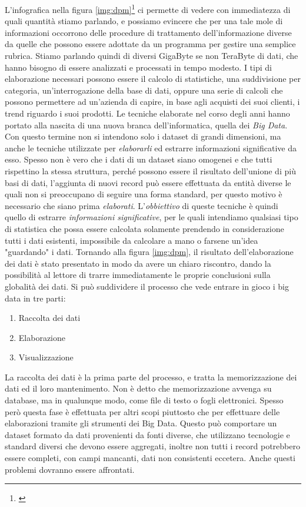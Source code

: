 L'infografica nella figura \ref{img:dpm}\footnote{\cite{data_per_minute}} ci permette di vedere con immediatezza di quali quantità stiamo parlando, e possiamo evincere che per una tale mole di informazioni occorrono delle procedure di trattamento dell'informazione diverse da quelle che possono essere adottate da un programma per gestire una semplice rubrica. Stiamo parlando quindi di diversi GigaByte se non TeraByte di dati, che hanno bisogno di essere analizzati e processati in tempo modesto. I tipi di elaborazione necessari possono essere il calcolo di statistiche, una suddivisione per categoria, un'interrogazione della base di dati, oppure una serie di calcoli che possono permettere ad un'azienda di capire, in base agli acquisti dei suoi clienti, i trend riguardo i suoi prodotti. Le tecniche elaborate nel corso degli anni hanno portato alla nascita di una nuova branca dell'informatica, quella dei \emph{Big Data}. Con questo termine non si intendono solo i dataset di grandi dimensioni, ma anche le tecniche utilizzate per \emph{elaborarli} ed estrarre informazioni significative da esso. Spesso non è vero che i dati di un dataset siano omogenei e che tutti rispettino la stessa struttura, perché possono essere il risultato dell'unione di più basi di dati, l'aggiunta di nuovi record può essere effettuata da entità diverse le quali non si preoccupano di seguire una forma standard, per questo motivo è necessario che siano prima \emph{elaborati}. L'\emph{obbiettivo} di queste tecniche è quindi quello di estrarre \emph{informazioni significative}, per le quali intendiamo qualsiasi tipo di statistica che possa essere calcolata solamente prendendo in considerazione tutti i dati esistenti, impossibile da calcolare a mano o farsene un'idea "guardando" i dati. Tornando alla figura \ref{img:dpm}, il risultato dell'elaborazione dei dati è stato presentato in modo da avere un chiaro riscontro, dando la possibilità al lettore di trarre immediatamente le proprie conclusioni sulla globalità dei dati.
Si può suddividere il processo che vede entrare in gioco i big data in tre parti:
\begin{enumerate}
\item Raccolta dei dati
\item Elaborazione
\item Visualizzazione
\end{enumerate}
La raccolta dei dati è la prima parte del processo, e tratta la memorizzazione dei dati ed il loro mantenimento. Non è detto che memorizzazione avvenga su database, ma in qualunque modo, come file di testo o fogli elettronici. Spesso però questa fase è effettuata per altri scopi piuttosto che per effettuare delle elaborazioni tramite gli strumenti dei Big Data. Questo può comportare un dataset formato da dati provenienti da fonti diverse, che utilizzano tecnologie e standard diversi che devono essere aggregati, inoltre non tutti i record potrebbero essere completi, con campi mancanti, dati non consistenti eccetera. Anche questi problemi dovranno essere affrontati.
